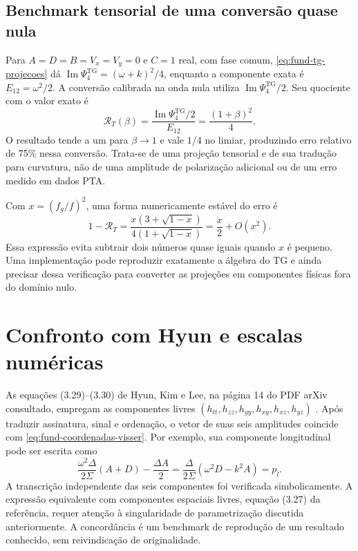 \subsection{Benchmark tensorial de uma conversão quase nula}

Para \(A=D=B=V_x=V_y=0\) e \(C=1\) real, com fase comum,
\eqref{eq:fund-tg-projecoes} dá
\(\operatorname{Im}\Psi_4^{\mathrm{TG}}=(\omega+k)^2/4\),
enquanto a componente exata é \(E_{12}=\omega^2/2\).
A conversão calibrada na onda nula utiliza
\(\operatorname{Im}\Psi_4^{\mathrm{TG}}/2\). Seu quociente com
o valor exato é
\begin{equation}
 \mathcal R_T(\beta)
 =\frac{\operatorname{Im}\Psi_4^{\mathrm{TG}}/2}{E_{12}}
 =\frac{(1+\beta)^2}{4}.
 \label{eq:fund-erro-tensorial}
\end{equation}
O resultado tende a um para \(\beta\to1\) e vale \(1/4\) no
limiar, produzindo erro relativo de 75\% nessa conversão. Trata-se de
uma projeção tensorial e de sua tradução para curvatura, não de uma
amplitude de polarização adicional ou de um erro medido em dados PTA.

Com \(x=(f_g/f)^2\), uma forma numericamente estável do erro é
\begin{equation}
 1-\mathcal R_T
 =\frac{x(3+\sqrt{1-x})}{4(1+\sqrt{1-x})}
 =\frac{x}{2}+O(x^2).
 \label{eq:fund-erro-estavel}
\end{equation}
Essa expressão evita subtrair dois números quase iguais quando
\(x\) é pequeno. Uma implementação pode reproduzir exatamente a
álgebra do TG e ainda precisar dessa verificação para converter as
projeções em componentes físicas fora do domínio nulo.

\section{Confronto com Hyun e escalas numéricas}

As equações (3.29)--(3.30) de Hyun, Kim e Lee, na página 14 do PDF
arXiv consultado, empregam as componentes livres
\((h_{tt},h_{zz},h_{yy},h_{xy},h_{xz},h_{yz})\)
\autocite{hyun2019}. Após traduzir assinatura, sinal e ordenação, o
vetor de suas seis amplitudes coincide com
\eqref{eq:fund-coordenadas-visser}. Por exemplo, sua componente
longitudinal pode ser escrita como
\begin{equation}
 \frac{\omega^2\Delta}{2\Sigma}(A+D)-\frac{\Delta A}{2}
 =\frac{\Delta}{2\Sigma}(\omega^2D-k^2A)=p_l.
 \label{eq:fund-hyun-longitudinal}
\end{equation}
A transcrição independente das seis componentes foi verificada
simbolicamente. A expressão equivalente com componentes espaciais
livres, equação (3.27) da referência, requer atenção à singularidade de
parametrização discutida anteriormente. A concordância é um benchmark
de reprodução de um resultado conhecido, sem reivindicação de
originalidade.

